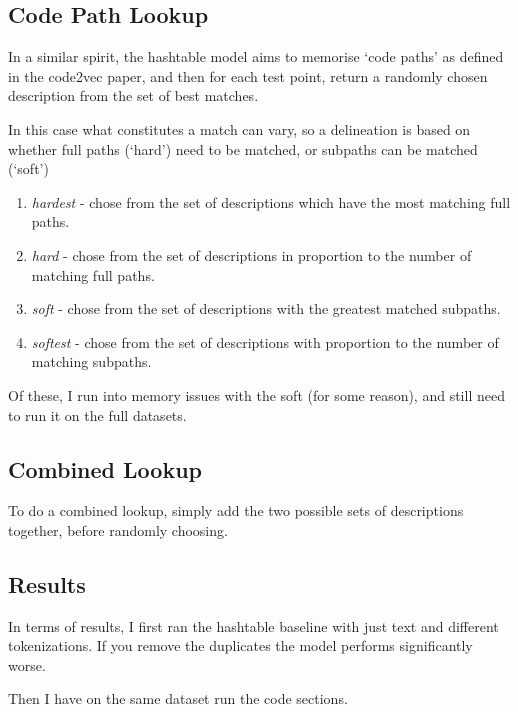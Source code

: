 \subsection{Code Path Lookup} %
\label{sub:code_path_lookup}

In a similar spirit, the hashtable model aims to memorise `code paths' as defined in the code2vec paper, and then for each test point, return a randomly chosen description from the set of best matches.

In this case what constitutes a match can vary, so a delineation is based on whether full paths (`hard') need to be matched, or subpaths can be matched (`soft')
\begin{enumerate}
    \item \textit{hardest} - chose from the set of descriptions which have the most matching full paths.
    \item \textit{hard} - chose from the set of descriptions in proportion to the number of matching full paths.
    \item \textit{soft} - chose from the set of descriptions with the greatest matched subpaths.
    \item \textit{softest} - chose from the set of descriptions  with proportion to the number of matching subpaths.
\end{enumerate}

Of these, I run into memory issues with the soft (for some reason), and still need to run it on the full datasets. 

\subsection{Combined Lookup} %
\label{sub:combined_lookup}

To do a combined lookup, simply add the two possible sets of descriptions together, before randomly choosing. 


\subsection{Results} %
\label{sub:results}

In terms of results, I first ran the hashtable baseline with just text and different tokenizations. If you remove the duplicates the model performs significantly worse.

Then I have on the same dataset run the code sections.

